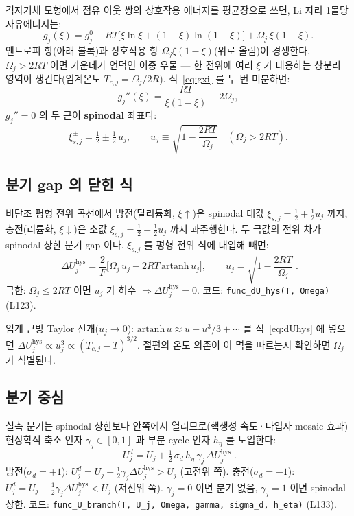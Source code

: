 \documentclass[11pt,a4paper]{article}
\newcommand{\hys}{\mathrm{hys}}
\begin{document}
격자기체 모형에서 점유 이웃 쌍의 상호작용 에너지를 평균장으로 쓰면, Li 자리
1몰당 자유에너지는:
\begin{equation}
g_j(\xi) = g_j^0 + RT\bigl[\xi\ln\xi + (1-\xi)\ln(1-\xi)\bigr] + \Omega_j\,\xi(1-\xi).
\label{eq:gxi}
\end{equation}
엔트로피 항(아래 볼록)과 상호작용 항 $\Omega_j\xi(1-\xi)$(위로 올림)이 경쟁한다.
$\Omega_j > 2RT$ 이면 가운데가 언덕인 이중 우물 — 한 전위에 여러 $\xi$ 가 대응하는
상분리 영역이 생긴다(임계온도 $T_{c,j}=\Omega_j/2R$). 식~\eqref{eq:gxi} 를 두 번 미분하면:
\begin{equation}
g_j''(\xi) = \frac{RT}{\xi(1-\xi)} - 2\Omega_j,
\end{equation}
$g_j''=0$ 의 두 근이 \textbf{spinodal} 좌표다:
\begin{equation}
\xi_{s,j}^\pm = \tfrac12 \pm \tfrac12\,u_j,\qquad
u_j \equiv \sqrt{1-\frac{2RT}{\Omega_j}}\quad(\Omega_j > 2RT).
\label{eq:spinodal}
\end{equation}

\subsection{분기 gap 의 닫힌 식}

비단조 평형 전위 곡선에서 방전(탈리튬화, $\xi\uparrow$)은 spinodal 대값
$\xi_{s,j}^+ = \tfrac12+\tfrac12 u_j$ 까지, 충전(리튬화, $\xi\downarrow$)은 소값
$\xi_{s,j}^- = \tfrac12-\tfrac12 u_j$ 까지 과주행한다.
두 극값의 전위 차가 spinodal 상한 분기 gap 이다.
$\xi_{s,j}^\pm$ 를 평형 전위 식에 대입해 빼면:
\begin{equation}
\boxed{\;\Delta U_j^\hys =
  \frac{2}{F}\bigl[\Omega_j\,u_j - 2RT\,\mathrm{artanh}\,u_j\bigr],\qquad
  u_j = \sqrt{1-\frac{2RT}{\Omega_j}}\;.}
\label{eq:dUhys}
\end{equation}
극한: $\Omega_j \le 2RT$ 이면 $u_j$ 가 허수 $\Rightarrow \Delta U_j^\hys = 0$. 코드:
\texttt{func\_dU\_hys(T, Omega)} (L123).

임계 근방 Taylor 전개($u_j\to0$): $\mathrm{artanh}\,u \approx u + u^3/3 + \cdots$
를 식~\eqref{eq:dUhys} 에 넣으면 $\Delta U_j^\hys \propto u_j^3 \propto (T_{c,j}-T)^{3/2}$.
절편의 온도 의존이 이 멱을 따르는지 확인하면 $\Omega_j$ 가 식별된다.

\subsection{분기 중심}

실측 분기는 spinodal 상한보다 안쪽에서 열리므로(핵생성 속도·다입자 mosaic 효과)
현상학적 축소 인자 $\gamma_j\in[0,1]$ 과 부분 cycle 인자 $h_\eta$ 를 도입한다:
\begin{equation}
\boxed{\;U_j^d = U_j + \tfrac12\,\sigma_d\,h_\eta\,\gamma_j\,\Delta U_j^\hys\;.}
\label{eq:Ubranch}
\end{equation}
방전($\sigma_d=+1$): $U_j^d = U_j + \tfrac12\gamma_j\Delta U_j^\hys > U_j$ (고전위 쪽).
충전($\sigma_d=-1$): $U_j^d = U_j - \tfrac12\gamma_j\Delta U_j^\hys < U_j$ (저전위 쪽).
$\gamma_j=0$ 이면 분기 없음, $\gamma_j=1$ 이면 spinodal 상한. 코드:
\texttt{func\_U\_branch(T, U\_j, Omega, gamma, sigma\_d, h\_eta)} (L133).
\end{document}
